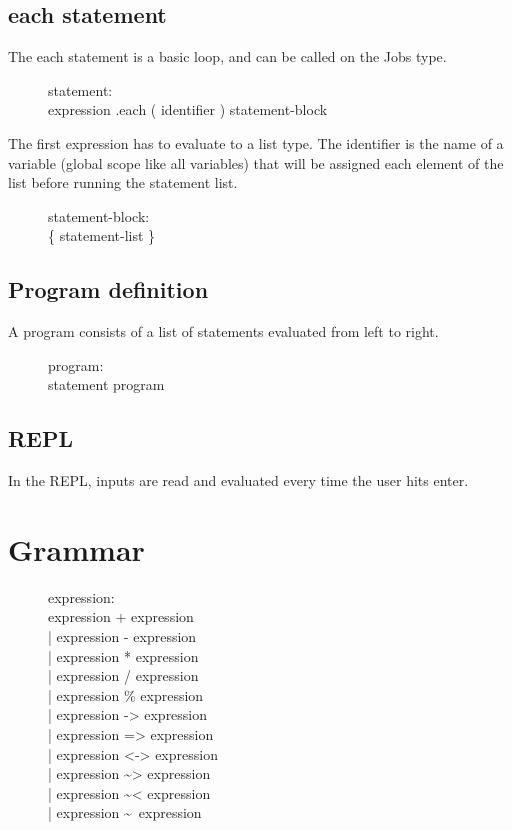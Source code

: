 \subsection{each statement}
The each statement is a basic loop, and can be called on the Jobs type.
\begin{description}
  \item[]statement: \hfill \\
    expression .each ( identifier ) statement-block
\end{description}
The first expression has to evaluate to a list type. The identifier is the name
of a variable (global scope like all variables) that will be assigned each
element of the list before running the statement list.
\begin{description}
  \item[]statement-block: \hfill \\
    \{ statement-list \}
\end{description}

\subsection{Program definition}
A program consists of a list of statements evaluated from left to right.\\
\begin{description}
  \item[]program: \hfill \\
    statement program
\end{description}

\subsection{REPL}
In the REPL, inputs are read and evaluated every time the user hits enter.\\

\section{Grammar}
\begin{description}
  \item[]expression: \hfill \\
    expression + expression \\
    | expression - expression \\
    | expression * expression \\
    | expression / expression \\
    | expression \% expression \\
    | expression -> expression \\
    | expression => expression \\
    | expression <-> expression \\
    | expression \textasciitilde> expression \\
    | expression \textasciitilde< expression \\
    | expression \textasciitilde~expression \\
\end{description}


